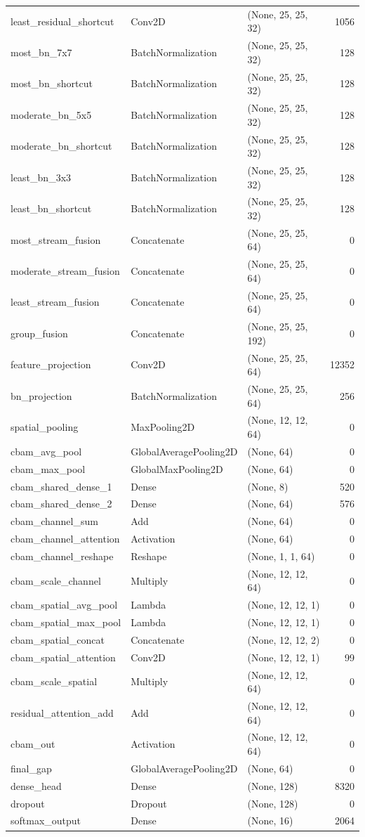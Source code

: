 \begin{tabular}{lllr}
least_residual_shortcut & Conv2D & (None, 25, 25, 32) & 1056 \\
most_bn_7x7 & BatchNormalization & (None, 25, 25, 32) & 128 \\
most_bn_shortcut & BatchNormalization & (None, 25, 25, 32) & 128 \\
moderate_bn_5x5 & BatchNormalization & (None, 25, 25, 32) & 128 \\
moderate_bn_shortcut & BatchNormalization & (None, 25, 25, 32) & 128 \\
least_bn_3x3 & BatchNormalization & (None, 25, 25, 32) & 128 \\
least_bn_shortcut & BatchNormalization & (None, 25, 25, 32) & 128 \\
most_stream_fusion & Concatenate & (None, 25, 25, 64) & 0 \\
moderate_stream_fusion & Concatenate & (None, 25, 25, 64) & 0 \\
least_stream_fusion & Concatenate & (None, 25, 25, 64) & 0 \\
group_fusion & Concatenate & (None, 25, 25, 192) & 0 \\
feature_projection & Conv2D & (None, 25, 25, 64) & 12352 \\
bn_projection & BatchNormalization & (None, 25, 25, 64) & 256 \\
spatial_pooling & MaxPooling2D & (None, 12, 12, 64) & 0 \\
cbam_avg_pool & GlobalAveragePooling2D & (None, 64) & 0 \\
cbam_max_pool & GlobalMaxPooling2D & (None, 64) & 0 \\
cbam_shared_dense_1 & Dense & (None, 8) & 520 \\
cbam_shared_dense_2 & Dense & (None, 64) & 576 \\
cbam_channel_sum & Add & (None, 64) & 0 \\
cbam_channel_attention & Activation & (None, 64) & 0 \\
cbam_channel_reshape & Reshape & (None, 1, 1, 64) & 0 \\
cbam_scale_channel & Multiply & (None, 12, 12, 64) & 0 \\
cbam_spatial_avg_pool & Lambda & (None, 12, 12, 1) & 0 \\
cbam_spatial_max_pool & Lambda & (None, 12, 12, 1) & 0 \\
cbam_spatial_concat & Concatenate & (None, 12, 12, 2) & 0 \\
cbam_spatial_attention & Conv2D & (None, 12, 12, 1) & 99 \\
cbam_scale_spatial & Multiply & (None, 12, 12, 64) & 0 \\
residual_attention_add & Add & (None, 12, 12, 64) & 0 \\
cbam_out & Activation & (None, 12, 12, 64) & 0 \\
final_gap & GlobalAveragePooling2D & (None, 64) & 0 \\
dense_head & Dense & (None, 128) & 8320 \\
dropout & Dropout & (None, 128) & 0 \\
softmax_output & Dense & (None, 16) & 2064 \\
\bottomrule
\end{tabular}

